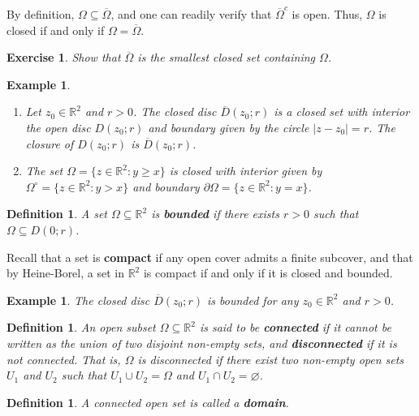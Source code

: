 \documentclass[10pt]{article}
\newcommand{\R}{\mathbb{R}}
\theoremstyle{newstyle}
\newtheorem{defn}[thm]{Definition}
\newtheorem{exercise}[thm]{Exercise}
\newtheorem{exmp}[thm]{Example}
\begin{document}
By definition, $\Omega \subseteq \overline{\Omega}$, and one can readily verify that 
${\overline\Omega}^c$ is open. Thus, $\Omega$ is closed if and only if 
$\Omega = \overline\Omega$.

\begin{exercise}
Show that $\overline\Omega$ is the smallest closed set containing $\Omega$.
\end{exercise}

\begin{exmp}~
\begin{enumerate}[(1)]
    \item Let $z_0 \in \R^2$ and $r > 0$. 
    The closed disc $\overline{D}(z_0; r)$ is a closed set with interior the open disc 
    $D(z_0; r)$ and boundary given by the circle $|z - z_0| = r$. The closure of 
    $D(z_0; r)$ is $\overline{D}(z_0; r)$.
    \item The set $\Omega = \{z \in \R^2 : y \geq x\}$ is closed with interior given by
    $\Omega^\circ = \{z \in \R^2 : y > x\}$ and boundary $\partial\Omega = \{z \in \R^2 : y = x\}$.
\end{enumerate}
\end{exmp}

\begin{defn}
A set $\Omega \subseteq \R^2$ is {\bf bounded} if there exists $r > 0$ such that $\Omega 
\subseteq D(0; r)$.
\end{defn}

Recall that a set is {\bf compact} if any open cover admits a finite subcover, 
and that by Heine-Borel, a set in $\R^2$ is compact if and only if it is closed and bounded.

\begin{exmp}
The closed disc $\overline{D}(z_0; r)$ is bounded for any $z_0 \in \R^2$ and $r > 0$.
\end{exmp}

\begin{defn}
An open subset $\Omega \subseteq \R^2$ is said to be {\bf connected} if it cannot be written 
as the union of two disjoint non-empty sets, and {\bf disconnected} if it is not connected. 
That is, $\Omega$ is disconnected if there exist two non-empty open sets $U_1$ and $U_2$ 
such that $U_1 \cup U_2 = \Omega$ and $U_1 \cap U_2 = \varnothing$. 
\end{defn}

\begin{defn}
A connected open set is called a {\bf domain}.
\end{defn}
\end{document}
